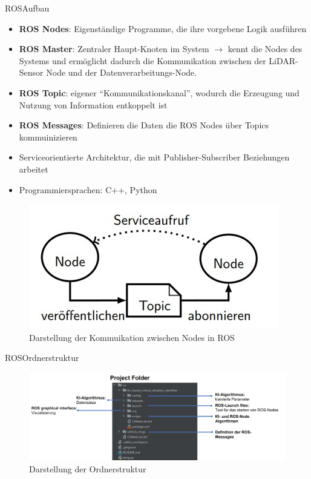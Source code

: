 \documentclass[169, handout	]{THIbeamer} %
\begin{document}
	\begin{frame}{ROS}{Aufbau}
		\footnotesize
		\begin{itemize}
			\item \textbf{ROS Nodes}: Eigenständige Programme, die ihre vorgebene Logik ausführen
			\item \textbf{ROS Master}: Zentraler Haupt-Knoten im System $\rightarrow$ kennt die Nodes des Systems und ermöglicht dadurch die Kommunikation zwischen der LiDAR-Sensor Node und der Datenverarbeitungs-Node.
			\item \textbf{ROS Topic}: eigener \enquote{Kommunikationskanal}, wodurch die Erzeugung und Nutzung von Information entkoppelt ist
			\item \textbf{ROS Messages}: Definieren die Daten die ROS Nodes über Topics kommuinizieren
			\item Serviceorientierte Architektur, die mit Publisher-Subscriber Beziehungen arbeitet
			\item Programmiersprachen: C++, Python 
		\end{itemize}				
		\begin{figure}
			\includegraphics[scale=0.35]{required/ROS-Aufbau.jpg}
			\caption{Darstellung der Kommuikation zwischen Nodes in ROS}
		\end{figure}
	\end{frame}
	\begin{frame}{ROS}{Ordnerstruktur}
		\begin{figure}
			\includegraphics[scale=0.5]{required/ROS_Folder_Structure.jpg}
			\caption{Darstellung der Ordnerstruktur}
		\end{figure}
	\end{frame}
\end{document}
